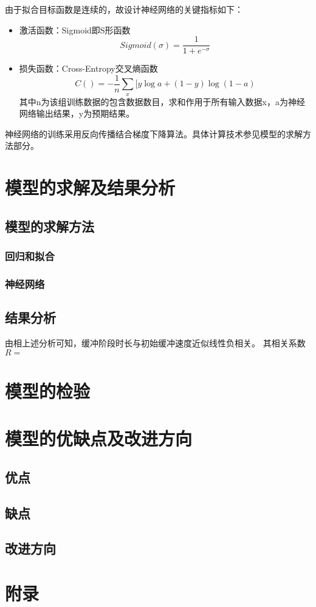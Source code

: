 \documentclass[UTF8]{ctexart}
\begin{document}
由于拟合目标函数是连续的，故设计神经网络的关键指标如下：
\begin{itemize}
    \item 激活函数：Sigmoid即S形函数
    \[Sigmoid(\sigma)=\frac{1}{1+e^{-\sigma}}\]
    \item 损失函数：Cross-Entropy交叉熵函数
    \[C()=-\frac{1}{n}\sum\limits_{x}[y\log a+(1-y)\log(1-a)\]
    其中n为该组训练数据的包含数据数目，求和作用于所有输入数据x，a为神经网络输出结果，y为预期结果。
\end{itemize}
神经网络的训练采用反向传播结合梯度下降算法。具体计算技术参见模型的求解方法部分。

\section{模型的求解及结果分析}
\subsection{模型的求解方法}
\subsubsection{回归和拟合}

\subsubsection{神经网络}
\subsection{结果分析}
由相上述分析可知，缓冲阶段时长与初始缓冲速度近似线性负相关。
其相关系数 $R= $

\section{模型的检验}
\section{模型的优缺点及改进方向}
\subsection{优点}
\subsection{缺点}
\subsection{改进方向}
\section{附录}
\end{document}

